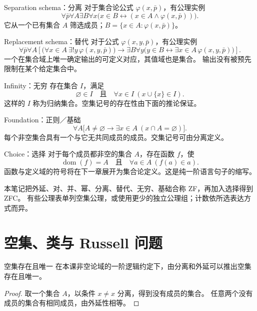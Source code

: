 \begin{axiom}{Separation schema：分离}
对于集合论公式 \(\varphi(x,\bar p)\)，有公理实例
\[
 \forall\bar p\forall A\exists B\forall x
 \bigl(x\in B\leftrightarrow(x\in A\land\varphi(x,\bar p))\bigr).
\]
它从一个已有集合 \(A\) 筛选成员；\(B=\{x\in A:\varphi(x,\bar p)\}\)。
\end{axiom}

\begin{axiom}{Replacement schema：替代}
对于公式 \(\varphi(x,y,\bar p)\)，有公理实例
\[
\forall\bar p\forall A\left[
 \bigl(\forall x\in A\ \exists!y\,\varphi(x,y,\bar p)\bigr)
 \to\exists B\forall y\bigl(y\in B\leftrightarrow\exists x\in A\,\varphi(x,y,\bar p)\bigr)
\right].
\]
一个在集合域上唯一确定输出的可定义对应，其值域也是集合。
输出没有被预先限制在某个给定集合中。
\end{axiom}

\begin{axiom}{Infinity：无穷}
存在集合 \(I\)，满足
\[
 \varnothing\in I\quad\text{且}\quad\forall x\in I\ (x\cup\{x\}\in I).
\]
这样的 \(I\) 称为归纳集合。空集记号的存在性由下面的推论保证。
\end{axiom}

\begin{axiom}{Foundation：正则／基础}
\[
 \forall A\bigl[A\ne\varnothing\to\exists x\in A\ (x\cap A=\varnothing)\bigr].
\]
每个非空集合具有一个与它无共同成员的成员。交集记号可由分离定义。
\end{axiom}

\begin{axiom}{Choice：选择}
对于每个成员都非空的集合 \(A\)，存在函数 \(f\)，使
\[
 \operatorname{dom}(f)=A\quad\text{且}\quad\forall a\in A\ (f(a)\in a).
\]
函数与定义域的符号将在下一章展开为集合论定义。这是纯一阶语言句子的缩写。
\end{axiom}
本笔记把外延、对、并、幂、分离、替代、无穷、基础合称 ZF，再加入选择得到 ZFC。
有些公理表单列空集公理，或使用更少的独立公理组；计数依所选表达方式而异。

\section{空集、类与 Russell 问题}
\begin{theorem}{空集存在且唯一}
在本课非空论域的一阶逻辑约定下，由分离和外延可以推出空集存在且唯一。
\end{theorem}
\begin{proof}
取一个集合 \(A\)，以条件 \(x\ne x\) 分离，得到没有成员的集合。
任意两个没有成员的集合有相同成员，由外延性相等。
\end{proof}

